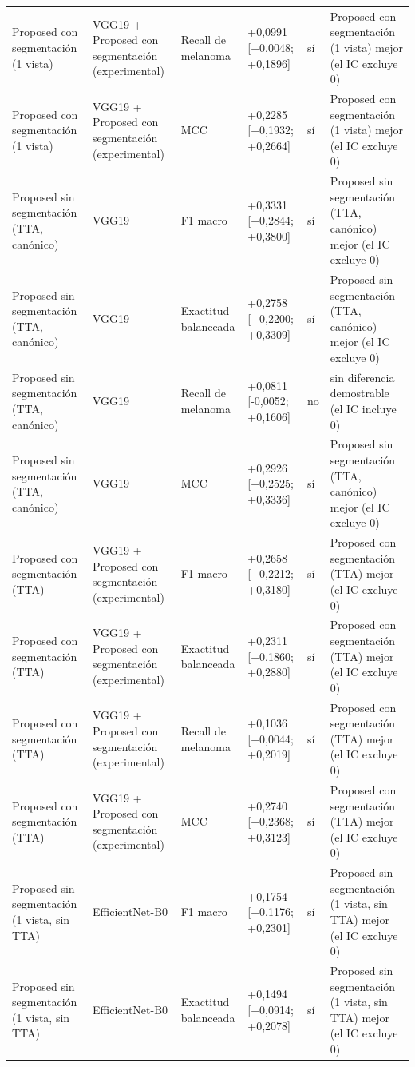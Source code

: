 \begin{longtable}{@{}llllll@{}}
Proposed con segmentación (1 vista) & VGG19 + Proposed con segmentación (experimental) & Recall de melanoma & +0,0991 [+0,0048; +0,1896] & sí & Proposed con segmentación (1 vista) mejor (el IC excluye 0) \\
Proposed con segmentación (1 vista) & VGG19 + Proposed con segmentación (experimental) & MCC & +0,2285 [+0,1932; +0,2664] & sí & Proposed con segmentación (1 vista) mejor (el IC excluye 0) \\
Proposed sin segmentación (TTA, canónico) & VGG19 & F1 macro & +0,3331 [+0,2844; +0,3800] & sí & Proposed sin segmentación (TTA, canónico) mejor (el IC excluye 0) \\
Proposed sin segmentación (TTA, canónico) & VGG19 & Exactitud balanceada & +0,2758 [+0,2200; +0,3309] & sí & Proposed sin segmentación (TTA, canónico) mejor (el IC excluye 0) \\
Proposed sin segmentación (TTA, canónico) & VGG19 & Recall de melanoma & +0,0811 [-0,0052; +0,1606] & no & sin diferencia demostrable (el IC incluye 0) \\
Proposed sin segmentación (TTA, canónico) & VGG19 & MCC & +0,2926 [+0,2525; +0,3336] & sí & Proposed sin segmentación (TTA, canónico) mejor (el IC excluye 0) \\
Proposed con segmentación (TTA) & VGG19 + Proposed con segmentación (experimental) & F1 macro & +0,2658 [+0,2212; +0,3180] & sí & Proposed con segmentación (TTA) mejor (el IC excluye 0) \\
Proposed con segmentación (TTA) & VGG19 + Proposed con segmentación (experimental) & Exactitud balanceada & +0,2311 [+0,1860; +0,2880] & sí & Proposed con segmentación (TTA) mejor (el IC excluye 0) \\
Proposed con segmentación (TTA) & VGG19 + Proposed con segmentación (experimental) & Recall de melanoma & +0,1036 [+0,0044; +0,2019] & sí & Proposed con segmentación (TTA) mejor (el IC excluye 0) \\
Proposed con segmentación (TTA) & VGG19 + Proposed con segmentación (experimental) & MCC & +0,2740 [+0,2368; +0,3123] & sí & Proposed con segmentación (TTA) mejor (el IC excluye 0) \\
Proposed sin segmentación (1 vista, sin TTA) & EfficientNet-B0 & F1 macro & +0,1754 [+0,1176; +0,2301] & sí & Proposed sin segmentación (1 vista, sin TTA) mejor (el IC excluye 0) \\
Proposed sin segmentación (1 vista, sin TTA) & EfficientNet-B0 & Exactitud balanceada & +0,1494 [+0,0914; +0,2078] & sí & Proposed sin segmentación (1 vista, sin TTA) mejor (el IC excluye 0) \\

\end{longtable}
